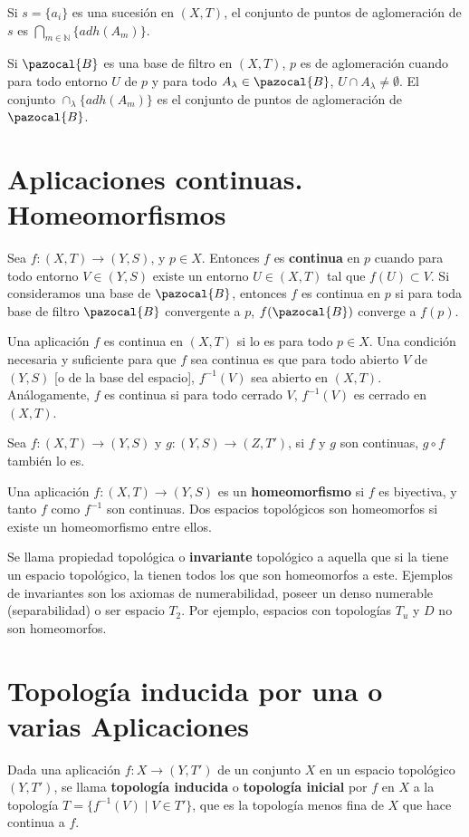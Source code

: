 \documentclass[a4paper, 11pt]{extarticle}
\let\mathcal\pazocal
\begin{document}
Si \(s = \{ a_i \}\) es una sucesión en \((X,T)\), el conjunto de puntos de
aglomeración de \(s\) es \(\bigcap_{m \in \mathbb{N}}^{} \{ adh(A_m) \}\).

Si \(\mathcal{B}\) es una base de filtro en \((X,T)\), \(p\) es de
aglomeración cuando para todo entorno \(U\) de \(p\) y para todo \(A_\lambda \in \mathcal{B}\), \(U \cap A_\lambda \neq \emptyset\).
 El conjunto \(\cap_\lambda \{ adh(A_m) \}\) es el conjunto de puntos de
 aglomeración de \(\mathcal{B}\).

\section{Aplicaciones continuas. Homeomorfismos}
\label{sec:orge7ddd32}
Sea \(f:(X,T) \rightarrow (Y, S)\), y \(p \in X\). Entonces \(f\) es
\textbf{continua} en \(p\) cuando para todo entorno \(V \in (Y,S)\) existe un entorno
\(U \in (X,T)\) tal que \(f(U) \subset V\). Si consideramos una base de \(\mathcal{B}\), entonces \(f\) es continua en \(p\) si para toda base de
filtro \(\mathcal{B}\) convergente a \(p\), \(f(\mathcal{B})\) converge a
\(f(p)\).

Una aplicación \(f\) es continua en \((X,T)\) si lo es para todo \(p \in X\). Una condición necesaria y suficiente para que \(f\) sea continua es que
para todo abierto \(V\) de \((Y,S)\) [o de la base del espacio], 
\(f^{-1}(V)\) sea abierto en \((X,
T)\). Análogamente, \(f\) es continua si para todo cerrado \(V\), \(f
^{-1}(V)\) es cerrado en \((X,T)\).

Sea \(f: (X,T) \rightarrow (Y,S)\) y \(g:(Y,S) \rightarrow (Z,T')\), si \(f\) y \(g\) son continuas, \(g \circ f\) también lo es.

Una aplicación \(f: (X,T) \rightarrow  (Y,S)\) es un \textbf{homeomorfismo} si \(f\)
es biyectiva, y tanto \(f\) como \(f ^{-1}\) son continuas. Dos espacios
topológicos son homeomorfos si existe un homeomorfismo entre ellos.

Se llama propiedad topológica o \textbf{invariante} topológico a aquella que si la tiene
un espacio topológico, la tienen todos los que son homeomorfos a este. Ejemplos
de invariantes son los axiomas de numerabilidad, poseer un denso numerable
(separabilidad) o ser espacio \(T_2\). Por ejemplo, espacios con topologías \(T_u\) y \(D\) no son homeomorfos.

\section{Topología inducida por una o varias Aplicaciones}
\label{sec:org6246d96}
Dada una aplicación \(f: X \rightarrow  (Y, T')\) de un conjunto \(X\) en un
espacio topológico \((Y, T')\), se llama \textbf{topología inducida} o \textbf{topología
inicial} por \(f\) en \(X\) a la topología \(T = \{ f ^{-1}(V) \;|\; V \in T' \}\), que es la
topología menos fina de \(X\) que hace continua a \(f\).
\end{document}
